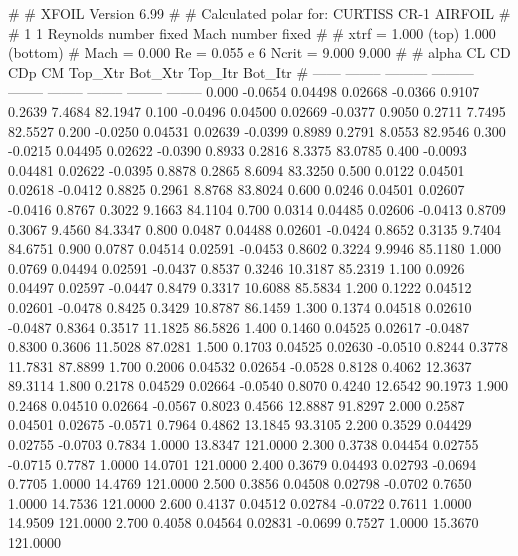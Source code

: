 #  
#       XFOIL         Version 6.99
#  
# Calculated polar for: CURTISS CR-1 AIRFOIL                            
#  
# 1 1 Reynolds number fixed          Mach number fixed         
#  
# xtrf =   1.000 (top)        1.000 (bottom)  
# Mach =   0.000     Re =     0.055 e 6     Ncrit =   9.000  9.000
#  
#   alpha    CL        CD       CDp       CM     Top_Xtr  Bot_Xtr  Top_Itr  Bot_Itr
#  ------ -------- --------- --------- -------- -------- -------- -------- --------
   0.000  -0.0654   0.04498   0.02668  -0.0366   0.9107   0.2639   7.4684  82.1947
   0.100  -0.0496   0.04500   0.02669  -0.0377   0.9050   0.2711   7.7495  82.5527
   0.200  -0.0250   0.04531   0.02639  -0.0399   0.8989   0.2791   8.0553  82.9546
   0.300  -0.0215   0.04495   0.02622  -0.0390   0.8933   0.2816   8.3375  83.0785
   0.400  -0.0093   0.04481   0.02622  -0.0395   0.8878   0.2865   8.6094  83.3250
   0.500   0.0122   0.04501   0.02618  -0.0412   0.8825   0.2961   8.8768  83.8024
   0.600   0.0246   0.04501   0.02607  -0.0416   0.8767   0.3022   9.1663  84.1104
   0.700   0.0314   0.04485   0.02606  -0.0413   0.8709   0.3067   9.4560  84.3347
   0.800   0.0487   0.04488   0.02601  -0.0424   0.8652   0.3135   9.7404  84.6751
   0.900   0.0787   0.04514   0.02591  -0.0453   0.8602   0.3224   9.9946  85.1180
   1.000   0.0769   0.04494   0.02591  -0.0437   0.8537   0.3246  10.3187  85.2319
   1.100   0.0926   0.04497   0.02597  -0.0447   0.8479   0.3317  10.6088  85.5834
   1.200   0.1222   0.04512   0.02601  -0.0478   0.8425   0.3429  10.8787  86.1459
   1.300   0.1374   0.04518   0.02610  -0.0487   0.8364   0.3517  11.1825  86.5826
   1.400   0.1460   0.04525   0.02617  -0.0487   0.8300   0.3606  11.5028  87.0281
   1.500   0.1703   0.04525   0.02630  -0.0510   0.8244   0.3778  11.7831  87.8899
   1.700   0.2006   0.04532   0.02654  -0.0528   0.8128   0.4062  12.3637  89.3114
   1.800   0.2178   0.04529   0.02664  -0.0540   0.8070   0.4240  12.6542  90.1973
   1.900   0.2468   0.04510   0.02664  -0.0567   0.8023   0.4566  12.8887  91.8297
   2.000   0.2587   0.04501   0.02675  -0.0571   0.7964   0.4862  13.1845  93.3105
   2.200   0.3529   0.04429   0.02755  -0.0703   0.7834   1.0000  13.8347 121.0000
   2.300   0.3738   0.04454   0.02755  -0.0715   0.7787   1.0000  14.0701 121.0000
   2.400   0.3679   0.04493   0.02793  -0.0694   0.7705   1.0000  14.4769 121.0000
   2.500   0.3856   0.04508   0.02798  -0.0702   0.7650   1.0000  14.7536 121.0000
   2.600   0.4137   0.04512   0.02784  -0.0722   0.7611   1.0000  14.9509 121.0000
   2.700   0.4058   0.04564   0.02831  -0.0699   0.7527   1.0000  15.3670 121.0000
